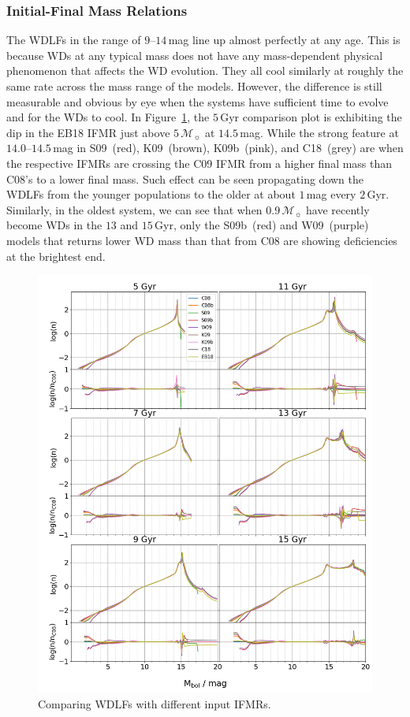 \documentclass[fleqn,usenatbib]{rasti}
\newcommand{\msun}{\mathcal{M}_{\sun}}
\begin{document}
\subsubsection{Initial-Final Mass Relations}
The WDLFs in the range of $9$--$14$\,mag line up almost perfectly at any age.
This is because WDs at any typical mass does not have any mass-dependent
physical phenomenon that affects the WD evolution. They all cool similarly at
roughly the same rate across the mass range of the models. However, the
difference is still measurable and obvious by eye when the systems have
sufficient time to evolve and for the WDs to cool. In 
Figure~\ref{fig:wdlf_compare_ifmr}, the $5$\,Gyr comparison plot is exhibiting
the dip in the EB18 IFMR just above $5\,\msun$ at $14.5$\,mag. While the strong
feature at $14.0$--$14.5$\,mag in S09~(red), K09~(brown), K09b~(pink), and
C18~(grey) are when the respective IFMRs are crossing the C09 IFMR from a higher
final mass than C08's to a lower final mass. Such effect can be seen propagating
down the WDLFs from the younger populations to the older at about $1$\,mag every
$2$\,Gyr. Similarly, in the oldest system, we can see that when $0.9\,\msun$
have recently become WDs in the $13$ and $15$\,Gyr, only the S09b~(red) and
W09~(purple) models that returns lower WD mass than that from C08 are showing
deficiencies at the brightest end. 

\begin{figure}
    \centering
    \includegraphics[width=\textwidth]{wdlf_compare_ifmr.png}
    \caption{Comparing WDLFs with different input IFMRs.}
    \label{fig:wdlf_compare_ifmr}
\end{figure}
\end{document}
